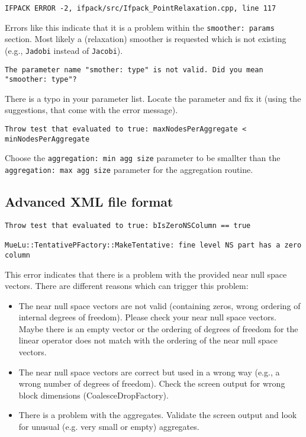 \documentclass[10pt,fleqn]{book}
\begin{document}
\begin{cBox}
\begin{lstlisting}
IFPACK ERROR -2, ifpack/src/Ifpack_PointRelaxation.cpp, line 117
\end{lstlisting}
\end{cBox}
Errors like this indicate that it is a problem within the \verb|smoother: params| section. Most likely a (relaxation) smoother is requested which is not existing (e.g., \verb|Jadobi| instead of \verb|Jacobi|).

\begin{cBox}
\begin{lstlisting}
The parameter name "smother: type" is not valid. Did you mean "smoother: type"?
\end{lstlisting}
\end{cBox}
There is a typo in your parameter list. Locate the parameter and fix it (using the suggestions, that come with the error message).

\begin{cBox}
\begin{lstlisting}
Throw test that evaluated to true: maxNodesPerAggregate < minNodesPerAggregate
\end{lstlisting}
\end{cBox}
Choose the \verb|aggregation: min agg size| parameter to be smallter than the \verb|aggregation: max agg size| parameter for the aggregation routine.

\subsection{Advanced XML file format}

\begin{cBox}
\begin{lstlisting}
Throw test that evaluated to true: bIsZeroNSColumn == true

MueLu::TentativePFactory::MakeTentative: fine level NS part has a zero column
\end{lstlisting}
\end{cBox}
This error indicates that there is a problem with the provided near null space vectors. There are different reasons which can trigger this problem:
\begin{itemize}
\item The near null space vectors are not valid (containing zeros, wrong ordering of internal degrees of freedom). Please check your near null space vectors. Maybe there is an empty vector or the ordering of degrees of freedom for the linear operator does not match with the ordering of the near null space vectors.
\item The near null space vectors are correct but used in a wrong way (e.g., a wrong number of degrees of freedom). Check the screen output for wrong block dimensions (CoalesceDropFactory).
\item There is a problem with the aggregates. Validate the screen output and look for unusual (e.g. very small or empty) aggregates.
\end{itemize}
\end{document}
